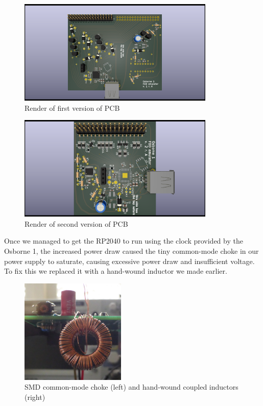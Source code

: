 \documentclass[a4paper]{article}
\begin{document}
\begin{figure}
  \centering
  \includegraphics[height=5cm]{pcb-v1}
  \caption{Render of first version of PCB}
\end{figure}

\begin{figure}
  \centering
  \includegraphics[height=5cm]{pcb-v2}
  \caption{Render of second version of PCB}
\end{figure}

Once we managed to get the RP2040 to run using the clock provided by
the Osborne 1, the increased power draw caused the tiny common-mode
choke in our power supply to saturate, causing excessive power draw
and insufficient voltage. To fix this we replaced it with a hand-wound
inductor we made earlier.

\begin{figure}
  \centering
  \includegraphics[height=5cm]{inductors}
  \caption[Inductors]{SMD common-mode choke (left) and hand-wound
    coupled inductors (right)}
\end{figure}
\end{document}
